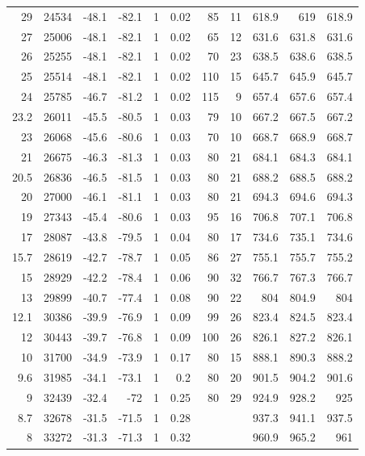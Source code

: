 \documentclass{article}
\begin{document}
\begin{longtable}{r|r|r|r|r|r|r|r|r|r|r}
29 & 24534 & -48.1 & -82.1 & 1 & 0.02 & 85 & 11 & 618.9 & 619 & 618.9 \\
27 & 25006 & -48.1 & -82.1 & 1 & 0.02 & 65 & 12 & 631.6 & 631.8 & 631.6 \\
26 & 25255 & -48.1 & -82.1 & 1 & 0.02 & 70 & 23 & 638.5 & 638.6 & 638.5 \\
25 & 25514 & -48.1 & -82.1 & 1 & 0.02 & 110 & 15 & 645.7 & 645.9 & 645.7 \\
24 & 25785 & -46.7 & -81.2 & 1 & 0.02 & 115 & 9 & 657.4 & 657.6 & 657.4 \\
23.2 & 26011 & -45.5 & -80.5 & 1 & 0.03 & 79 & 10 & 667.2 & 667.5 & 667.2 \\
23 & 26068 & -45.6 & -80.6 & 1 & 0.03 & 70 & 10 & 668.7 & 668.9 & 668.7 \\
21 & 26675 & -46.3 & -81.3 & 1 & 0.03 & 80 & 21 & 684.1 & 684.3 & 684.1 \\
20.5 & 26836 & -46.5 & -81.5 & 1 & 0.03 & 80 & 21 & 688.2 & 688.5 & 688.2 \\
20 & 27000 & -46.1 & -81.1 & 1 & 0.03 & 80 & 21 & 694.3 & 694.6 & 694.3 \\
19 & 27343 & -45.4 & -80.6 & 1 & 0.03 & 95 & 16 & 706.8 & 707.1 & 706.8 \\
17 & 28087 & -43.8 & -79.5 & 1 & 0.04 & 80 & 17 & 734.6 & 735.1 & 734.6 \\
15.7 & 28619 & -42.7 & -78.7 & 1 & 0.05 & 86 & 27 & 755.1 & 755.7 & 755.2 \\
15 & 28929 & -42.2 & -78.4 & 1 & 0.06 & 90 & 32 & 766.7 & 767.3 & 766.7 \\
13 & 29899 & -40.7 & -77.4 & 1 & 0.08 & 90 & 22 & 804 & 804.9 & 804 \\
12.1 & 30386 & -39.9 & -76.9 & 1 & 0.09 & 99 & 26 & 823.4 & 824.5 & 823.4 \\
12 & 30443 & -39.7 & -76.8 & 1 & 0.09 & 100 & 26 & 826.1 & 827.2 & 826.1 \\
10 & 31700 & -34.9 & -73.9 & 1 & 0.17 & 80 & 15 & 888.1 & 890.3 & 888.2 \\
9.6 & 31985 & -34.1 & -73.1 & 1 & 0.2 & 80 & 20 & 901.5 & 904.2 & 901.6 \\
9 & 32439 & -32.4 & -72 & 1 & 0.25 & 80 & 29 & 924.9 & 928.2 & 925 \\
8.7 & 32678 & -31.5 & -71.5 & 1 & 0.28 &   &   & 937.3 & 941.1 & 937.5 \\
8 & 33272 & -31.3 & -71.3 & 1 & 0.32 &   &   & 960.9 & 965.2 & 961 \\
\end{longtable}%
\end{document}
